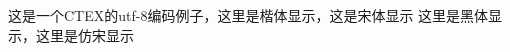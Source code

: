 \documentclass[UTF8]{article}
\begin{document}
    这是一个CTEX的utf-8编码例子，{\kaishu 这里是楷体显示}，{\songti 这是宋体显示}
    {\heiti 这里是黑体显示}，{\fangsong 这里是仿宋显示}
\end{document}
